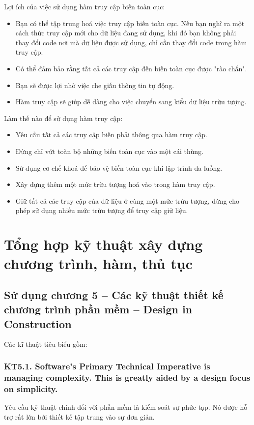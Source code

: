 \documentclass[12pt]{report}
\begin{document}
\noindent Lợi ích của việc sử dụng hàm truy cập biến toàn cục: 
\begin{itemize}
	\item Bạn có thể tập trung hoá việc truy cập biến toàn cục. Nếu bạn nghĩ ra một cách thức truy cập mới cho dữ liệu đang sử dụng, khi đó bạn không phải thay đổi code nơi mà dữ liệu được sử dụng, chỉ cần thay đổi code trong hàm truy cập. 
	\item Có thể đảm bảo rằng tất cả các truy cập đến biến toàn cục được "rào chắn".
	\item Bạn sẽ được lợi nhờ việc che giấu thông tin tự động. 
	\item Hàm truy cập sẽ giúp dễ dàng cho việc chuyển sang kiểu dữ liệu trừu tượng. 
\end{itemize}

\noindent Làm thế nào để sử dụng hàm truy cập:
\begin{itemize}
	\item Yêu cầu tất cả các truy cập biến phải thông qua hàm truy cập.
	\item Đừng chỉ vứt toàn bộ những biến toàn cục vào một cái thùng. 
	\item Sử dụng cơ chế khoá để bảo vệ biến toàn cục khi lập trình đa luồng. 
	\item Xây dựng thêm một mức trừu tượng hoá vào trong hàm truy cập. 
	\item Giữ tất cả các truy cập của dữ liệu ở cùng một mức trừu tượng, đừng cho phép sử dụng nhiều mức trừu tượng để truy cập giữ liệu. 
\end{itemize}

\section{\bfseries Tổng hợp kỹ thuật xây dựng chương trình, hàm, thủ tục}

\subsection{Sử dụng chương 5 -- Các kỹ thuật thiết kế chương trình phần mềm -- Design in Construction}
\noindent Các kĩ thuật tiêu biểu gồm:

\subsubsection{KT5.1. Software's Primary Technical Imperative is managing complexity. This is greatly aided by a design focus on simplicity.}
Yêu cầu kỹ thuật chính đối với phần mềm là kiểm soát sự phức tạp. Nó được hỗ trợ rất lớn bởi thiết kế tập trung vào sự đơn giản. 
\vspace*{3mm}
\end{document}
